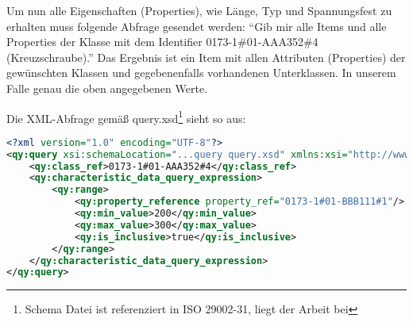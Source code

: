 Um nun alle Eigenschaften (Properties), wie Länge, Typ und Spannungsfest zu erhalten muss folgende Abfrage gesendet werden: 
\enquote{Gib mir alle Items und alle Properties der Klasse mit dem Identifier 0173-1\#01-AAA352\#4 (Kreuzschraube).}
Das Ergebnis ist ein Item mit allen Attributen (Properties) der gewünschten Klassen und gegebenenfalls vorhandenen Unterklassen. In unserem Falle genau die oben angegebenen Werte.

Die XML-Abfrage gemäß query.xsd\footnote{Schema Datei ist referenziert in ISO 29002-31, liegt der Arbeit bei} sieht so aus:

\begin{lstlisting}[caption=Query Beispiel - Daten mit Suchausdruck abfragen, language=XML, label=lst:UseCaseDatenabfragenAnhang]
<?xml version="1.0" encoding="UTF-8"?>
<qy:query xsi:schemaLocation="...query query.xsd" xmlns:xsi="http://www.w3.org/2001/XMLSchema-instance" xmlns:cat="...catalogue" xmlns:val="...value" xmlns:qy="...query" xmlns:bas="...basic">
	<qy:class_ref>0173-1#01-AAA352#4</qy:class_ref>
	<qy:characteristic_data_query_expression>
		<qy:range>
			<qy:property_reference property_ref="0173-1#01-BBB111#1"/>
			<qy:min_value>200</qy:min_value>
			<qy:max_value>300</qy:max_value>
			<qy:is_inclusive>true</qy:is_inclusive>
		</qy:range>
	</qy:characteristic_data_query_expression>
</qy:query>
\end{lstlisting}
